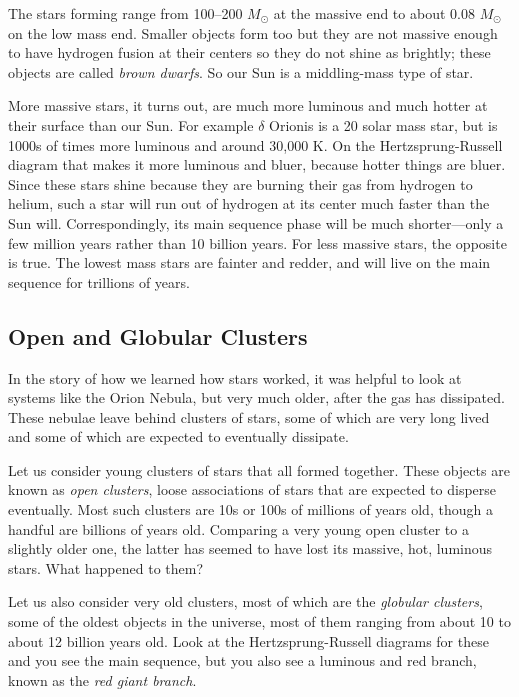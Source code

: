 \documentclass[12pt, preprint]{aastex}
\begin{document}
The stars forming range from 100--200 $M_\odot$ at the massive end to
about $0.08$ $M_\odot$ on the low mass end. Smaller objects form too
but they are not massive enough to have hydrogen fusion at their
centers so they do not shine as brightly; these objects are called
{\it brown dwarfs}. So our Sun is a middling-mass type of star.

More massive stars, it turns out, are much more luminous and much
hotter at their surface than our Sun. For example $\delta$ Orionis is
a 20 solar mass star, but is 1000s of times more luminous and around
30,000 K. On the Hertzsprung-Russell diagram that makes it more
luminous and bluer, because hotter things are bluer. Since these stars
shine because they are burning their gas from hydrogen to helium, such
a star will run out of hydrogen at its center much faster than the Sun
will. Correspondingly, its main sequence phase will be much
shorter---only a few million years rather than 10 billion years.  For
less massive stars, the opposite is true. The lowest mass stars are
fainter and redder, and will live on the main sequence for trillions
of years.

\subsection{Open and Globular Clusters}

In the story of how we learned how stars worked, it was helpful to
look at systems like the Orion Nebula, but very much older, after the
gas has dissipated. These nebulae leave behind clusters of stars, some
of which are very long lived and some of which are expected to
eventually dissipate.

Let us consider young clusters of stars that all formed
together. These objects are known as {\it open clusters}, loose
associations of stars that are expected to disperse eventually. Most
such clusters are 10s or 100s of millions of years old, though a
handful are billions of years old. Comparing a very young open cluster
to a slightly older one, the latter has seemed to have lost its
massive, hot, luminous stars. What happened to them?

Let us also consider very old clusters, most of which are the {\it
  globular clusters}, some of the oldest objects in the universe, most
of them ranging from about 10 to about 12 billion years old. Look at
the Hertzsprung-Russell diagrams for these and you see the main
sequence, but you also see a luminous and red branch, known as the
{\it red giant branch}.
\end{document}
